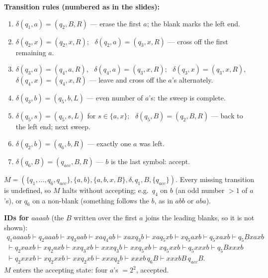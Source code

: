 \documentclass[11pt,a4paper]{article}
\begin{document}
\begin{solution}
\par\noindent\textbf{Transition rules (numbered as in the slides):}
{\small\begin{enumerate}[label=\arabic*.,itemsep=0pt]
\item $\delta(q_1,a)=(q_2,B,R)$ --- erase the first $a$; the blank marks the left end.
\item $\delta(q_2,x)=(q_2,x,R)$; \ $\delta(q_2,a)=(q_3,x,R)$ --- cross off the first remaining $a$.
\item $\delta(q_3,a)=(q_4,a,R)$, \ $\delta(q_4,a)=(q_3,x,R)$; \ $\delta(q_3,x)=(q_3,x,R)$, \ $\delta(q_4,x)=(q_4,x,R)$ --- leave and cross off the $a$'s alternately.
\item $\delta(q_3,b)=(q_5,b,L)$ --- even number of $a$'s: the sweep is complete.
\item $\delta(q_5,s)=(q_5,s,L)$ for $s\in\{a,x\}$; \ $\delta(q_5,B)=(q_2,B,R)$ --- back to the left end; next sweep.
\item $\delta(q_2,b)=(q_6,b,R)$ --- exactly one $a$ was left.
\item $\delta(q_6,B)=(q_{acc},B,R)$ --- $b$ is the last symbol: accept.
\end{enumerate}}
$M=(\{q_1,\dots,q_6,q_{acc}\},\{a,b\},\{a,b,x,B\},\delta,q_1,B,\{q_{acc}\})$. Every missing transition is undefined, so $M$ halts without accepting; e.g.\ $q_4$ on $b$ (an odd number $>1$ of $a$'s), or $q_6$ on a non-blank (something follows the $b$, as in $abb$ or $aba$).

\textbf{IDs for $aaaab$} (the $B$ written over the first $a$ joins the leading blanks, so it is not shown):
\[\begin{array}{l}
q_1aaaab\vdash q_2aaab\vdash xq_3aab\vdash xaq_4ab\vdash xaxq_3b\vdash xaq_5xb\vdash xq_5axb\vdash q_5xaxb\vdash q_5Bxaxb\\
\vdash q_2xaxb\vdash xq_2axb\vdash xxq_3xb\vdash xxxq_3b\vdash xxq_5xb\vdash xq_5xxb\vdash q_5xxxb\vdash q_5Bxxxb\\
\vdash q_2xxxb\vdash xq_2xxb\vdash xxq_2xb\vdash xxxq_2b\vdash xxxb\,q_6B\vdash xxxbB\,q_{acc}B.
\end{array}\]
$M$ enters the accepting state: four $a$'s $=2^2$, accepted.
\end{solution}
\end{document}
